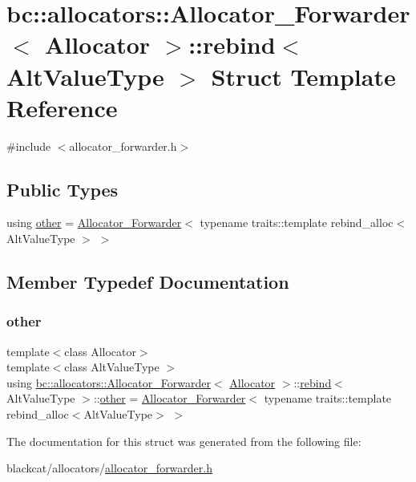 \hypertarget{structbc_1_1allocators_1_1Allocator__Forwarder_1_1rebind}{}\section{bc\+:\+:allocators\+:\+:Allocator\+\_\+\+Forwarder$<$ Allocator $>$\+:\+:rebind$<$ Alt\+Value\+Type $>$ Struct Template Reference}
\label{structbc_1_1allocators_1_1Allocator__Forwarder_1_1rebind}


{\ttfamily \#include $<$allocator\+\_\+forwarder.\+h$>$}

\subsection*{Public Types}
\begin{DoxyCompactItemize}
\item 
using \hyperlink{structbc_1_1allocators_1_1Allocator__Forwarder_1_1rebind_a691c054adedbdb2c1edeb6e426cfc0f7}{other} = \hyperlink{structbc_1_1allocators_1_1Allocator__Forwarder}{Allocator\+\_\+\+Forwarder}$<$ typename traits\+::template rebind\+\_\+alloc$<$ Alt\+Value\+Type $>$ $>$
\end{DoxyCompactItemize}


\subsection{Member Typedef Documentation}
\mbox{\label{structbc_1_1allocators_1_1Allocator__Forwarder_1_1rebind_a691c054adedbdb2c1edeb6e426cfc0f7}} 
\subsubsection{\texorpdfstring{other}{other}}
{\footnotesize\ttfamily template$<$class Allocator$>$ \\
template$<$class Alt\+Value\+Type $>$ \\
using \hyperlink{structbc_1_1allocators_1_1Allocator__Forwarder}{bc\+::allocators\+::\+Allocator\+\_\+\+Forwarder}$<$ \hyperlink{classbc_1_1allocators_1_1Allocator}{Allocator} $>$\+::\hyperlink{structbc_1_1allocators_1_1Allocator__Forwarder_1_1rebind}{rebind}$<$ Alt\+Value\+Type $>$\+::\hyperlink{structbc_1_1allocators_1_1Allocator__Forwarder_1_1rebind_a691c054adedbdb2c1edeb6e426cfc0f7}{other} =  \hyperlink{structbc_1_1allocators_1_1Allocator__Forwarder}{Allocator\+\_\+\+Forwarder}$<$ typename traits\+::template rebind\+\_\+alloc$<$Alt\+Value\+Type$>$ $>$}



The documentation for this struct was generated from the following file\+:\begin{DoxyCompactItemize}
\item 
blackcat/allocators/\hyperlink{allocator__forwarder_8h}{allocator\+\_\+forwarder.\+h}\end{DoxyCompactItemize}
